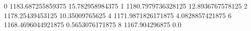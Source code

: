 0 1183.687255859375 15.782958984375
1 1180.7979736328125 12.8936767578125
2 1178.25439453125 10.35009765625
4 1171.9871826171875 4.0828857421875
6 1168.4696044921875 0.5653076171875
8 1167.904296875 0.0
